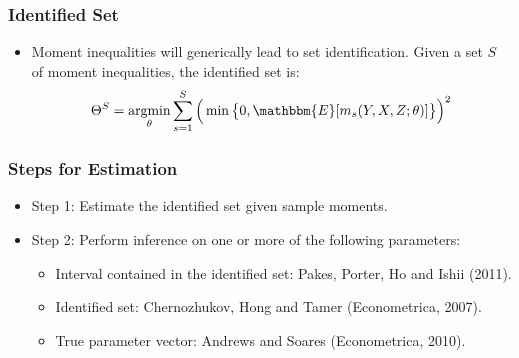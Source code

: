 \documentclass[10pt,letterpaper]{beamer}
\newcommand{\argmin}{\operatornamewithlimits{argmin}}
\begin{document}
\begin{frame}
\frametitle{Identified Set}

\begin{itemize}
	\item Moment inequalities will generically lead to set identification. Given a set $S$ of moment inequalities, the identified set is:
	\begin{equation*}
	\Theta^{S}=\argmin_{\theta}\sum_{s=1}^{S}\Big(\min\big\{0,\mathbbm{E}[m_{s}(Y,X,Z;\theta)]\big\}\Big)^{2}
	\end{equation*}
	\begin{figure}[h!]
	\begin{center}
	\end{center}
	\end{figure}	
\end{itemize}
\end{frame}
\begin{frame}
\frametitle{Steps for Estimation}

\begin{itemize}
	\item Step 1: Estimate the identified set given sample moments.
	\item Step 2: Perform inference on one or more of the following parameters:
	\begin{itemize}
		\item Interval contained in the identified set: Pakes, Porter, Ho and Ishii (2011).
		\item Identified set: Chernozhukov, Hong and Tamer (Econometrica, 2007).
		\item True parameter vector: Andrews and Soares (Econometrica, 2010).
	\end{itemize}
\end{itemize}
\end{frame}
\end{document}
